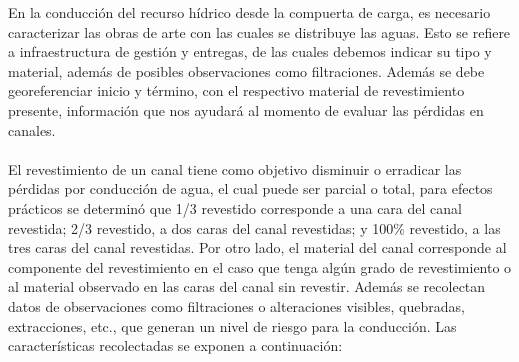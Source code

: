\documentclass[]{article}
\begin{document}
En la conducción del recurso hídrico desde la compuerta de carga, es necesario caracterizar las obras de arte con las cuales se distribuye las aguas. Esto se refiere a infraestructura de gestión y entregas, de las cuales debemos indicar su tipo y material, además de posibles observaciones como filtraciones. Además se debe georeferenciar inicio y término, con el respectivo material de revestimiento presente, información que nos ayudará al momento de evaluar las pérdidas en canales.\\
\\
El revestimiento de un canal tiene como objetivo disminuir o erradicar las pérdidas por conducción de agua, el cual puede ser parcial o total, para efectos prácticos se determinó que 1/3 revestido corresponde a una cara del canal revestida; 2/3 revestido, a dos caras del canal revestidas; y 100\% revestido, a las tres caras del canal revestidas. Por otro lado, el material del canal corresponde al componente del revestimiento en el caso que tenga algún grado de revestimiento o al material observado en las caras del canal sin revestir. Además se recolectan datos de observaciones como filtraciones o alteraciones visibles, quebradas, extracciones, etc., que generan un nivel de riesgo para la conducción. Las características recolectadas se exponen a continuación:\\
\\
\clearpage
\end{document}
